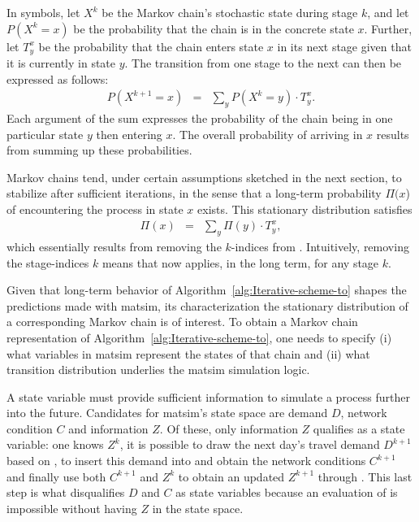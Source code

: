 In symbols, let $X^{k}$ be the Markov chain's stochastic state during stage $k$,
and let $P(X^{k}=x)$ be the probability that  the chain is in the
concrete state $x$. Further, let $T_{y}^{x}$ be the probability that the chain
enters state $x$ in its next stage\corr{,}{} given that it is currently in state
$y$.
The transition from one stage to the next can then be expressed as follows:
\begin{eqnarray}
P(X^{k+1}=x) & = & \sum_{y}P(X^{k}=y)\cdot T_{y}^{x}.\label{eq:one-mc-transition}
\end{eqnarray}
Each argument of the sum expresses the probability of the chain being
in one particular state $y$ then entering $x$. The overall
probability of arriving in $x$ results from summing up these probabilities.

Markov chains tend, under certain assumptions sketched in
the next section, to stabilize after sufficient iterations,
in the sense that a long-term probability $\Pi(x$) of
encountering the process in state $x$ exists. This stationary distribution
satisfies
\begin{eqnarray}
\Pi(x) & = & \sum_{y}\Pi(y)\cdot T_{y}^{x},\label{eq:mc-stationary}
\end{eqnarray}
which essentially results from removing the $k$-indices from .
Intuitively, removing the stage-indices $k$ means that 
now applies, in the long term, for any stage $k$.

Given that  long-term behavior of
Algorithm~\ref{alg:Iterative-scheme-to} shapes the predictions made with
\gls{matsim}, its characterization  the stationary
distribution of a corresponding Markov chain is of interest. To obtain a Markov chain
representation of Algorithm~\ref{alg:Iterative-scheme-to}, one needs to specify
(i) what variables in \gls{matsim} represent the states of that chain and (ii) what
transition distribution underlies the \gls{matsim} simulation logic.

A state variable must provide sufficient information to simulate a process
further into the future. Candidates for \gls{matsim}'s state space
are demand $D$,  network condition $C$ and 
information $Z$. Of these, only  information $Z$ qualifies as a
state variable:
 one knows $Z^{k}$, it is possible to draw the next day's travel
demand $D^{k+1}$\corr{,}{} based on , to insert this demand
into  and obtain the network conditions
$C^{k+1}$ and  finally use both $C^{k+1}$ and $Z^{k}$ to obtain an
updated $Z^{k+1}$ through .
This last step is what disqualifies $D$ and $C$ as state variables\corr{,}{}
because an evaluation of  is impossible without having $Z$ in
the state space.

